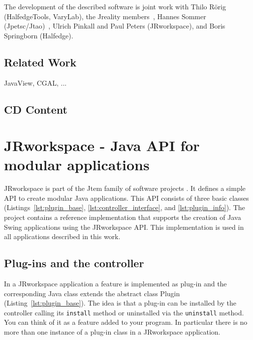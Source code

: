The development of the described software is joint work with Thilo R{\" o}rig 
({\sc HalfedgeTools, VaryLab}), the {\sc Jreality} members~\cite{JrealityWebsite}, Hannes 
Sommer ({\sc Jpetsc/Jtao})~\cite{jpetsctao-web-page}, Ulrich Pinkall and Paul Peters 
({\sc JRworkspace}), and Boris Springborn ({\sc Halfedge}).


\section{Related Work}
\label{sec:related_work}
JavaView, CGAL, ...

\section{CD Content}

\chapter{{\sc JRworkspace} - Java API for modular applications}
\label{sec:jrworkspace}


{\sc JRworkspace} is part of the {\sc Jtem} family of software projects 
\cite{JtemWebsite}. It defines a simple API to create modular Java applications. This API consists of
three basic classes (Listings~\ref{lst:plugin_base}, \ref{lst:controller_interface}, and 
\ref{lst:plugin_info}).
The project contains a reference implementation that supports the creation of Java
Swing applications using the {\sc JRworkspace} API. This implementation is used in all 
applications described in this work.

\section{Plug-ins and the controller}
\label{sec:plugins}

In a {\sc JRworkspace} application a feature is implemented as plug-in and the corresponding Java class 
extends the abstract class Plugin
(Listing~\ref{lst:plugin_base}). The idea is that a plug-in can be installed by the controller 
calling its {\tt install} method or uninstalled via the {\tt uninstall} method. You can think of it 
as a feature added to your program. In particular there is no more than one instance of a
plug-in class in a {\sc JRworkspace} application.

